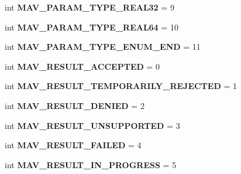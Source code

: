 \begin{DoxyCompactItemize}
int {\bfseries M\+A\+V\+\_\+\+P\+A\+R\+A\+M\+\_\+\+T\+Y\+P\+E\+\_\+\+R\+E\+A\+L32} = 9
\item 
\mbox{\label{namespacepymavlink_1_1dialects_1_1v10_a1d69a4472fb2e30ece3671e0cbfde53b}} 
int {\bfseries M\+A\+V\+\_\+\+P\+A\+R\+A\+M\+\_\+\+T\+Y\+P\+E\+\_\+\+R\+E\+A\+L64} = 10
\item 
\mbox{\label{namespacepymavlink_1_1dialects_1_1v10_ac700bffdb4b0d1a4efa4fe1d065960fa}} 
int {\bfseries M\+A\+V\+\_\+\+P\+A\+R\+A\+M\+\_\+\+T\+Y\+P\+E\+\_\+\+E\+N\+U\+M\+\_\+\+E\+ND} = 11
\item 
\mbox{\label{namespacepymavlink_1_1dialects_1_1v10_a2d3466e1ede77860359934879b6e7ac1}} 
int {\bfseries M\+A\+V\+\_\+\+R\+E\+S\+U\+L\+T\+\_\+\+A\+C\+C\+E\+P\+T\+ED} = 0
\item 
\mbox{\label{namespacepymavlink_1_1dialects_1_1v10_a7f3d5ccc744ac1bbaaeb1a0898b7c0a4}} 
int {\bfseries M\+A\+V\+\_\+\+R\+E\+S\+U\+L\+T\+\_\+\+T\+E\+M\+P\+O\+R\+A\+R\+I\+L\+Y\+\_\+\+R\+E\+J\+E\+C\+T\+ED} = 1
\item 
\mbox{\label{namespacepymavlink_1_1dialects_1_1v10_a9e39d06f4a3db03229595fee75c8f2ef}} 
int {\bfseries M\+A\+V\+\_\+\+R\+E\+S\+U\+L\+T\+\_\+\+D\+E\+N\+I\+ED} = 2
\item 
\mbox{\label{namespacepymavlink_1_1dialects_1_1v10_a2aebb48a203091486c5bd6735541f79f}} 
int {\bfseries M\+A\+V\+\_\+\+R\+E\+S\+U\+L\+T\+\_\+\+U\+N\+S\+U\+P\+P\+O\+R\+T\+ED} = 3
\item 
\mbox{\label{namespacepymavlink_1_1dialects_1_1v10_abdea4434a22948474e6051a7202d86f3}} 
int {\bfseries M\+A\+V\+\_\+\+R\+E\+S\+U\+L\+T\+\_\+\+F\+A\+I\+L\+ED} = 4
\item 
\mbox{\label{namespacepymavlink_1_1dialects_1_1v10_abba8500b71953971dad9dffb0f437277}} 
int {\bfseries M\+A\+V\+\_\+\+R\+E\+S\+U\+L\+T\+\_\+\+I\+N\+\_\+\+P\+R\+O\+G\+R\+E\+SS} = 5
\item 

\end{DoxyCompactItemize}
